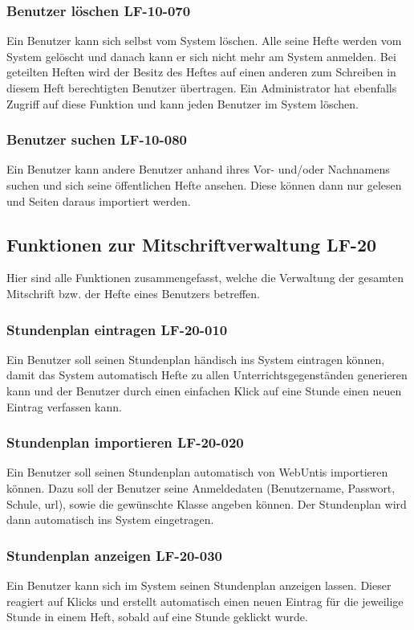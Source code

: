 \documentclass[12pt,a4paper,oneside,ngerman]{scrartcl}
\begin{document}
\subsubsection{Benutzer löschen \hfill LF-10-070}
Ein Benutzer kann sich selbst vom System löschen. Alle seine Hefte werden vom System gelöscht und danach kann er sich nicht mehr am System anmelden. Bei geteilten Heften wird der Besitz des Heftes auf einen anderen zum Schreiben in diesem Heft berechtigten Benutzer übertragen. Ein Administrator hat ebenfalls Zugriff auf diese Funktion und kann jeden Benutzer im System löschen.

\subsubsection{Benutzer suchen \hfill LF-10-080}
Ein Benutzer kann andere Benutzer anhand ihres Vor- und/oder Nachnamens suchen und sich seine öffentlichen Hefte ansehen. Diese können dann nur gelesen und Seiten daraus importiert werden.

\subsection[Funktionen zur Mitschriftverwaltung]{Funktionen zur Mitschriftverwaltung \hfill LF-20}
Hier sind alle Funktionen zusammengefasst, welche die Verwaltung der gesamten Mitschrift bzw. der Hefte eines Benutzers betreffen.

\subsubsection{Stundenplan eintragen \hfill LF-20-010}
Ein Benutzer soll seinen Stundenplan händisch ins System eintragen können, damit das System automatisch Hefte zu allen Unterrichtsgegenständen generieren kann und der Benutzer durch einen einfachen Klick auf eine Stunde einen neuen Eintrag verfassen kann.

\subsubsection{Stundenplan importieren \hfill LF-20-020}
Ein Benutzer soll seinen Stundenplan automatisch von \gls{WebUntis} importieren können. Dazu soll der Benutzer seine Anmeldedaten (Benutzername, Passwort, Schule, \gls{url}), sowie die gewünschte Klasse angeben können. Der Stundenplan wird dann automatisch ins System eingetragen.

\subsubsection{Stundenplan anzeigen \hfill LF-20-030}
Ein Benutzer kann sich im System seinen Stundenplan anzeigen lassen. Dieser reagiert auf Klicks und erstellt automatisch einen neuen Eintrag für die jeweilige Stunde in einem Heft, sobald auf eine Stunde geklickt wurde.
\end{document}
